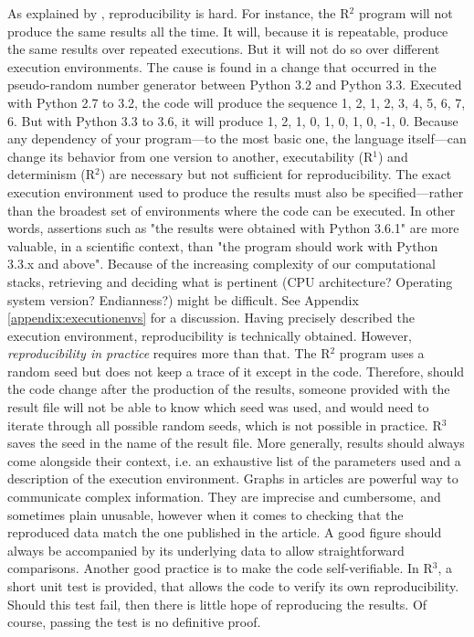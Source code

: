 \documentclass[a4paper,11pt]{article}
\begin{document}
As explained by \citeauthor{Mesnard:2016} \citep{Mesnard:2016}, reproducibility
is hard.  For instance, the R$^2$ program will not produce the same results all
the time. It will, because it is repeatable, produce the same results over
repeated executions.  But it will not do so over different execution
environments. The cause is found in a change that occurred in the pseudo-random
number generator between Python 3.2 and Python 3.3.  Executed with Python 2.7
to 3.2, the code will produce the sequence 1, 2, 1, 2, 3, 4, 5, 6, 7, 6. But
with Python 3.3 to 3.6, it will produce 1, 2, 1, 0, 1, 0, 1, 0, -1, 0.
Because any dependency of your program---to the most basic one, the language
itself---can change its behavior from one version to another, executability
(R$^1$) and determinism (R$^2$) are necessary but not sufficient for
reproducibility. The exact execution environment used to produce the results
must also be specified---rather than the broadest set of environments where the
code can be executed. In other words, assertions such as "the results were
obtained with Python 3.6.1" are more valuable, in a scientific context, than
"the program should work with Python 3.3.x and above".
Because of the increasing complexity of our computational stacks, retrieving
and deciding what is pertinent (CPU architecture? Operating system version?
Endianness?) might be difficult.  See Appendix \ref{appendix:executionenvs} for
a discussion.
Having precisely described the execution environment, reproducibility is technically obtained. However, \emph{reproducibility in practice} requires more than that.
The R$^2$ program uses a random seed but does not keep a trace of it except in
the code. Therefore, should the code change after the production of the
results, someone provided with the result file will not be able to know which
seed was used, and would need to iterate through all possible random seeds,
which is not possible in practice. R$^3$ saves the seed in the name of the
result file. More generally, results should always come alongside their
context, i.e. an exhaustive list of the parameters used and a description of
the execution environment.
Graphs in articles are powerful way to communicate complex information. They
are imprecise and cumbersome, and sometimes plain unusable, however when it
comes to checking that the reproduced data match the one published in the
article. A good figure should always be accompanied by its underlying data to
allow straightforward comparisons.
Another good practice is to make the code self-verifiable. In R$^3$, a short
unit test is provided, that allows the code to verify its own
reproducibility. Should this test fail, then there is little hope of
reproducing the results. Of course, passing the test is no definitive proof.\\
\end{document}
